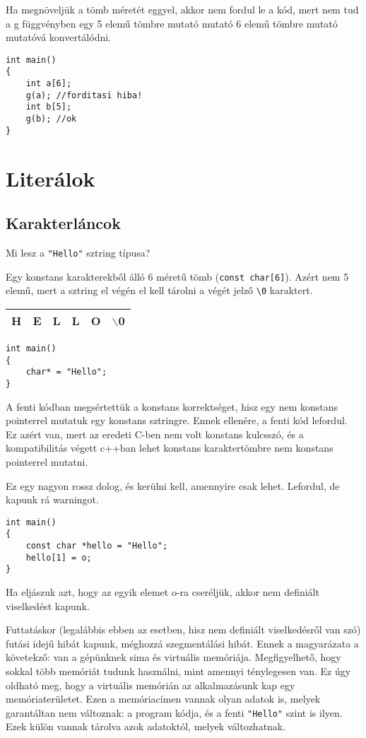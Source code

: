 \documentclass[a4paper,11.5pt]{article}
\begin{document}
	Ha megnöveljük a tömb méretét eggyel, akkor nem fordul le a kód, mert nem tud a g függvényben egy 5 elemű tömbre mutató mutató 6 elemű tömbre mutató mutatóvá konvertálódni.
	\begin{lstlisting}
int main()
{
	int a[6];
	g(a); //forditasi hiba!
	int b[5];
	g(b); //ok
}
	\end{lstlisting}
	
	\section{Literálok}
	\subsection{Karakterláncok}
	Mi lesz a \texttt{"Hello"} sztring típusa?
	\smallskip
	
	Egy konstans karakterekből álló 6 méretű tömb (\texttt{const char[6]}). Azért nem 5 elemű, mert a sztring el végén el kell tárolni a végét jelző \texttt{\textbackslash 0} karaktert.
	
	\begin{center}
		\begin{tabular}{|c|c|c|c|c|c|}
			\hline
			H&E&L&L&O&$\backslash$0\\
			\hline
		\end{tabular}
	\end{center}
	\begin{lstlisting}
int main()
{
	char* = "Hello";
}
	\end{lstlisting}
	A fenti kódban megsértettük a konstans korrektséget, hisz egy nem konstans pointerrel mutatuk egy konstans sztringre. Ennek ellenére, a fenti kód lefordul. Ez azért van, mert az eredeti C-ben nem volt konstans kulcsszó, és a kompatibilitás végett c++ban lehet konstans karaktertömbre nem konstans pointerrel mutatni.
	\begin{note}
		Ez egy nagyon rossz dolog, és kerülni kell, amennyire csak lehet. Lefordul, de kapunk rá warningot.
	\end{note}
	\begin{lstlisting}
int main()
{
	const char *hello = "Hello";
	hello[1] = o;
}
	\end{lstlisting}
	Ha eljászuk azt, hogy az egyik elemet o-ra cseréljük, akkor nem definiált viselkedést kapunk. 
	
	Futtatáskor (legalábbis ebben az esetben, hisz nem definiált viselkedésről van szó) futási idejű hibát kapunk, méghozzá szegmentálási hibát. Ennek a magyarázata a követekző: van a gépünknek sima és virtuális memóriája. Megfigyelhető, hogy sokkal több memóriát tudunk használni, mint amennyi ténylegesen van. Ez úgy oldható meg, hogy a virtuális memórián az alkalmazásunk kap egy memóriaterületet. Ezen a memóriacímen vannak olyan adatok is, melyek garantáltan nem változnak: a program kódja, és a fenti \texttt{"Hello"} szint is ilyen. Ezek külön vannak tárolva azok adatoktól, melyek változhatnak. 
	
\end{document}
